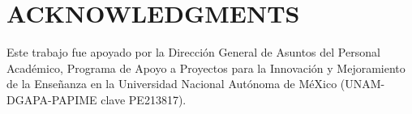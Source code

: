 \documentclass[12pt]{article}
\begin{document}
\section*{ACKNOWLEDGMENTS}
Este trabajo fue apoyado por la Dirección General de Asuntos del
Personal Académico, Programa de Apoyo a Proyectos para la Innovación y
Mejoramiento de la Enseñanza en la Universidad Nacional Autónoma de
MéXico (UNAM-DGAPA-PAPIME clave PE213817).

\newpage
 
\begin{small}

\end{small}
\end{document}
